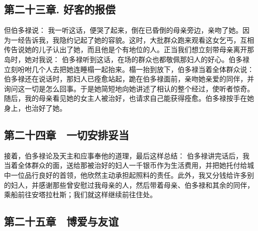 
\subsection{第二十三章. 好客的报偿}

但伯多禄说： 我一听这话，便哭了起来，倒在已昏倒的母亲旁边，亲吻了她。因为一经告诉我，我隐约记起了她的容貌。这时，大批群众跑来观看这女乞丐，互相传告说她的儿子认出了她，而且他是个有地位的人。正当我们想立刻带母亲离开那岛时，她对我说： 伯多禄听到这话，在场的群众也都敬佩那妇人的好心。伯多禄立刻吩咐几个人去把她连睡榻一起抬来。榻一抬到放下，伯多禄当着全体群众说： 伯多禄还在说话时，那妇人已痊愈站起，跪在伯多禄面前，亲吻她亲爱的同伴，并询问这一切是怎么回事。于是她简短地向她讲述了相认的整个经过，使听者惊奇。随后，我的母亲看见她的女主人被治好，也请求自己能获得痊愈。伯多禄按手在她身上，也治好了她。\par


\subsection{第二十四章　一切安排妥当}

接着，伯多禄论及天主和应事奉他的道理，最后这样总结： 伯多禄讲完话后，我当着全体群众的面，送给那被治好的妇人一千银币作为生活费用，并把她托付给城中一位品行良好的首领，他欣然主动承担起照料的责任。此外，我又分钱给许多别的妇人，并感谢那些曾安慰过我母亲的人，然后带着母亲、伯多禄和其余的同伴，乘船前往安塔拉杜斯；我们就这样继续前往住处。\par


\subsection{第二十五章　博爱与友谊}

